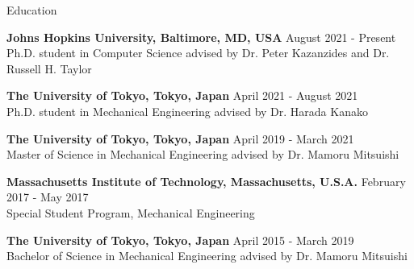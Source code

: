 \documentclass{resume} %
\begin{document}




\begin{rSection}{Education}

{\bf Johns Hopkins University, Baltimore, MD, USA}  \hfill {August 2021 - Present}\\
Ph.D. student in Computer Science
advised by Dr. Peter Kazanzides and  Dr. Russell H. Taylor

{\bf The University of Tokyo, Tokyo, Japan}  \hfill {April 2021 - August 2021}\\
Ph.D. student in Mechanical Engineering
advised by Dr. Harada Kanako

{\bf The University of Tokyo, Tokyo, Japan}  \hfill {April 2019 - March 2021}\\
Master of Science in Mechanical Engineering
advised by Dr. Mamoru Mitsuishi

{\bf Massachusetts Institute of Technology, Massachusetts, U.S.A.}  \hfill {February 2017 - May 2017}\\
Special Student Program, Mechanical Engineering

{\bf The University of Tokyo, Tokyo, Japan}  \hfill {April 2015 - March 2019}\\
Bachelor of Science in Mechanical Engineering
advised by Dr. Mamoru Mitsuishi

\end{rSection}

\end{document}
